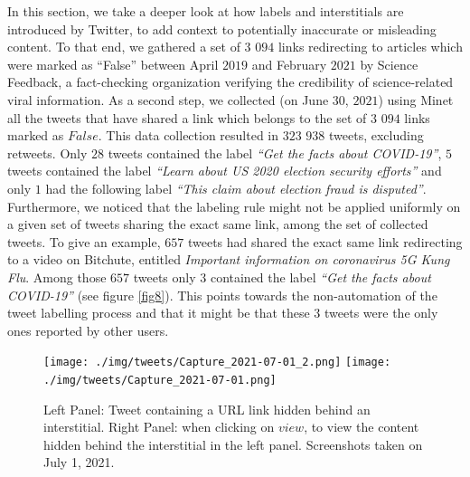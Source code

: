 \documentclass{article}
\begin{document}
\smallskip

In this section, we take a deeper look at how labels and interstitials are introduced by Twitter, to add context to potentially inaccurate or misleading content. To that end, we gathered a set of $3$ $094$ links redirecting to articles which were marked as ``False'' between April $2019$ and February $2021$ by Science Feedback, a fact-checking organization verifying the credibility of science-related viral information. 
As a second step, we collected (on June $30$, $2021$) using Minet~\cite{minet} all the tweets that have shared a link which belongs to the set of $3$ $094$ links marked as $False$. This data collection resulted in $323$ $938$ tweets, excluding retweets. Only $28$ tweets contained the label { \it ``Get the facts about COVID-19''}, $5$ tweets contained the label {\it ``Learn about US 2020 election security efforts''} and only $1$ had the following label {\it ``This claim about election fraud is disputed''}. Furthermore, we noticed that the labeling rule might not be applied uniformly on a given set of tweets sharing the exact same link, among the set of collected tweets. To give an example, $657$ tweets had shared the exact same link redirecting to a video on Bitchute, entitled {\it Important information on coronavirus 5G Kung Flu}. Among those $657$ tweets only $3$ contained the label {\it ``Get the facts about COVID-19''} (see figure \ref{fig8}). This points towards the non-automation of the tweet labelling process and that it might be that these $3$ tweets were the only ones reported by other users. 

\begin{figure}[h]
	\centering
		\texttt{[image: ./img/tweets/Capture\_2021-07-01\_2.png]} 
		\texttt{[image: ./img/tweets/Capture\_2021-07-01.png]}
	\caption{Left Panel: Tweet containing a URL link hidden behind an interstitial. Right Panel: when clicking on $view$, to view the content hidden behind the interstitial in the left panel. Screenshots taken on July 1, 2021. }
	\label{fig_notice}
\end{figure}
\smallskip
\end{document}
